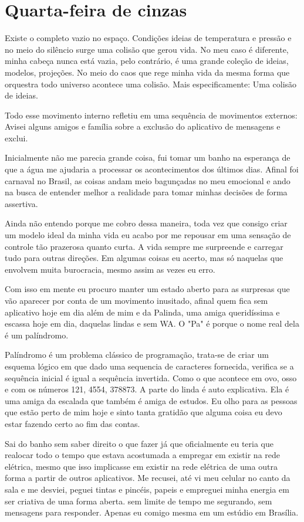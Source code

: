 \chapter{Quarta-feira de cinzas}\label{capitulo3}

Existe o completo vazio no espaço. Condições ideias de temperatura e pressão e no meio do silêncio surge uma colisão que gerou vida. No meu caso é diferente, minha cabeça nunca está vazia, pelo contrário, é uma grande coleção de ideias, modelos, projeções. No meio do caos que rege minha vida da mesma forma que orquestra todo universo acontece uma colisão. Mais especificamente: Uma colisão de ideias.

Todo esse movimento interno refletiu em uma sequência de movimentos externos: Avisei alguns amigos e família sobre a exclusão do aplicativo de mensagens e exclui.

Inicialmente não me parecia grande coisa, fui tomar um banho na esperança de que a água me ajudaria a processar os acontecimentos dos últimos dias. Afinal foi carnaval no Brasil, as coisas andam meio bagunçadas no meu emocional e ando na busca de entender melhor a realidade para tomar minhas decisões de forma assertiva.

Ainda não entendo porque me cobro dessa maneira, toda vez que consigo criar um modelo ideal da minha vida eu acabo por me repousar em uma sensação de controle tão prazerosa quanto curta. A vida sempre me surpreende e carregar tudo para outras direções. Em algumas coisas eu acerto, mas só naquelas que envolvem muita burocracia, mesmo assim as vezes eu erro.

Com isso em mente eu procuro manter um estado aberto para as surpresas que vão aparecer por conta de um movimento inusitado, afinal quem fica sem aplicativo hoje em dia além de mim e da Palinda, uma amiga queridíssima e escassa hoje em dia, daquelas lindas e sem WA. O "Pa" é porque o nome real dela é um palíndromo. 

Palíndromo é um problema clássico de programação, trata-se de criar um esquema lógico em que dado uma sequencia de caracteres fornecida, verifica se a sequência inicial é igual a sequência invertida. Como o que acontece em ovo, osso e com os números 121, 4554, 378873. A parte do linda é auto explicativa. Ela é uma amiga da escalada que também é amiga de estudos. Eu olho para as pessoas que estão perto de mim hoje e sinto tanta gratidão que alguma coisa eu devo estar fazendo certo ao fim das contas.

Sai do banho sem saber direito o que fazer já que oficialmente eu teria que realocar todo o tempo que estava acostumada a empregar em existir na rede elétrica, mesmo que isso implicasse em existir na rede elétrica de uma outra forma a partir de outros aplicativos. Me recusei, até vi meu celular no canto da sala e me desviei, peguei tintas e pincéis, papeis e empreguei minha energia em ser criativa de uma forma aberta. sem limite de tempo me segurando, sem mensagens para responder. Apenas eu comigo mesma em um estúdio em Brasília.






